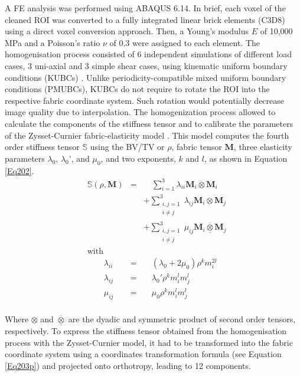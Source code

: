 \documentclass[a4paper,fleqn]{DC_ArtStyle}
\begin{document}
	A \si{\micro}FE analysis was performed using \textsc{ABAQUS 6.14}. In brief, each voxel of the cleaned ROI was converted to a fully integrated linear brick elements (C3D8) using a direct voxel conversion approach. Then, a Young's modulus $E$ of 10,000 MPa and a Poisson's ratio $\nu$ of 0.3 were assigned to each element. The homogenisation process consisted of 6 independent simulations of different load cases, 3 uni-axial and 3 simple shear cases, using kinematic uniform boundary conditions (KUBCs) \cite{Panyasantisuk2015}. Unlike periodicity-compatible mixed uniform boundary conditions (PMUBCs), KUBCs do not require to rotate the ROI into the respective fabric coordinate system. Such rotation would potentially decrease image quality due to interpolation. The homogenization process allowed to calculate the components of the stiffness tensor and to calibrate the parameters of the Zysset-Curnier fabric-elasticity model \cite{Zysset1995}. This model computes the fourth order stiffness tensor $\mathbb{S}$ using the BV/TV or $\rho$, fabric tensor $\mathbf{M}$, three elasticity parameters $\lambda_0$, $\lambda_0$', and $\mu_0$, and two exponents, $k$ and $l$, as shown in Equation \ref{Eq202}.\\
	
	\begin{equation}
	\begin{split}
	&\mathbb{S}(\rho,\mathbf{M}) &=& \quad\sum_{i=1}^{3} \lambda_{ii} \mathbf{M}_i \otimes \mathbf{M}_i \\ &&&+ \sum_{\substack{i,j=1\\i \neq j}}^{3} \lambda_{ij} \mathbf{M}_i \otimes \mathbf{M}_j \\ &&&+ \sum_{\substack{i,j=1\\i \neq j}}^{3} \mu_{ij} \mathbf{M}_i \overline{\underline{\otimes}} \mathbf{M}_j \\
	&\text{with} &\\
	&\qquad\lambda_{ii} &=& \quad(\lambda_0 + 2\mu_0)\rho^k m_i^{2l} \\
	&\qquad\lambda_{ij} &=& \quad\lambda_0' \rho^k m_i^{l} m_j^{l} \\
	&\qquad\mu_{ij} &=& \quad\mu_0 \rho^k m_i^{l} m_j^{l} \\
	\end{split}
	\label{Eq202}
	\end{equation}
	
	Where $\otimes$ and $\overline{\underline{\otimes}}$ are the dyadic and symmetric product of second order tensors, respectively. To express the stiffness tensor obtained from the homogenisation process with the Zysset-Curnier model, it had to be transformed into the fabric coordinate system using a coordinates transformation formula (see Equation \ref{Eq203p}) and projected onto orthotropy, leading to 12 components. 
	
\end{document}
